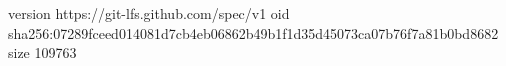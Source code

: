 version https://git-lfs.github.com/spec/v1
oid sha256:07289fceed014081d7cb4eb06862b49b1f1d35d45073ca07b76f7a81b0bd8682
size 109763
